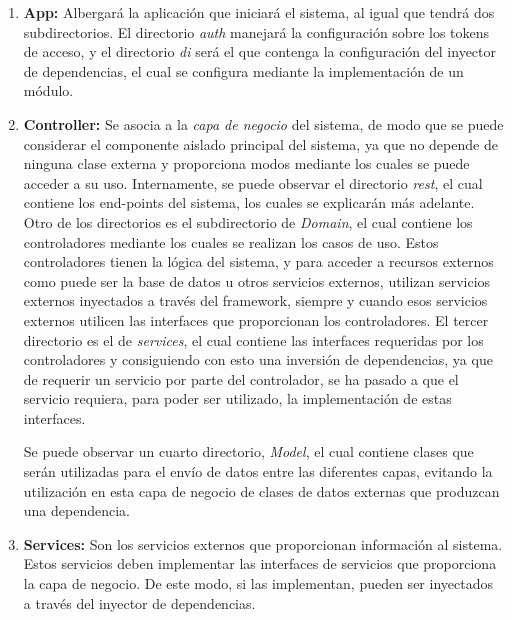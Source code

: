     \begin{enumerate}
        \item \textbf{App:}
        Albergará la aplicación que iniciará el sistema, al igual que tendrá dos subdirectorios. El directorio \textit{auth} manejará la configuración sobre los tokens de acceso, y el directorio \textit{di} será el que contenga la configuración del inyector de dependencias, el cual se configura mediante la implementación de un módulo.
        
        \item \textbf{Controller:}
        Se asocia a la \textit{capa de negocio} del sistema, de modo que se puede considerar el componente aislado principal del sistema, ya que no depende de ninguna clase externa y proporciona modos mediante los cuales se puede acceder a su uso.
        Internamente, se puede observar el directorio \textit{rest}, el cual contiene los end-points del sistema, los cuales se explicarán más adelante. Otro de los directorios es el subdirectorio de \textit{Domain}, el cual contiene los controladores mediante los cuales se realizan los casos de uso. Estos controladores tienen la lógica del sistema, y para acceder a recursos externos como puede ser la base de datos u otros servicios externos, utilizan servicios externos inyectados a través del framework, siempre y cuando esos servicios externos utilicen las interfaces que proporcionan los controladores. El tercer directorio es el de \textit{services}, el cual contiene las interfaces requeridas por los controladores y consiguiendo con esto una inversión de dependencias, ya que de requerir un servicio por parte del controlador, se ha pasado a que el servicio requiera, para poder ser utilizado, la implementación de estas interfaces.
        
        Se puede observar un cuarto directorio, \textit{Model}, el cual contiene clases que serán utilizadas para el envío de datos entre las diferentes capas, evitando la utilización en esta capa de negocio de clases de datos externas que produzcan una dependencia.
        
        \item \textbf{Services:}
        Son los servicios externos que proporcionan información al sistema. Estos servicios deben implementar las interfaces de servicios que proporciona la capa de negocio. De este modo, si las implementan, pueden ser inyectados a través del inyector de dependencias.
    \end{enumerate}
    


